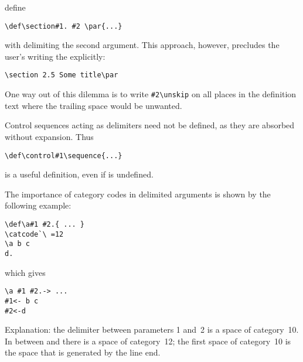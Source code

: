 \documentclass[letterpaper]{book}
\begin{document}
define
\begin{verbatim}
\def\section#1. #2 \par{...}
\end{verbatim}
with  delimiting the second
argument. This approach, however,
precludes  the user's writing the  explicitly:
\begin{verbatim}
\section 2.5 Some title\par
\end{verbatim}
One way out of this dilemma is to write
\verb>#2\unskip> on all places in the definition text
where the trailing space would be unwanted.

Control sequences acting as delimiters need not be defined,
as they are absorbed without expansion. Thus
\begin{verbatim}
\def\control#1\sequence{...}
\end{verbatim}
is a useful
definition, even if  is undefined.

The importance of category codes in delimited arguments
is shown by the following example:
\begin{verbatim}
\def\a#1 #2.{ ... }
\catcode`\ =12
\a b c
d.
\end{verbatim}
which gives
\begin{verbatim}
\a #1 #2.-> ...
#1<- b c
#2<-d
\end{verbatim}
Explanation: the delimiter between parameters 1 and~2 is a space
of category~10.
In between  and  there is a space
of category~12;
the first space of  category~10
is the space that is generated by the line end.
\end{document}

